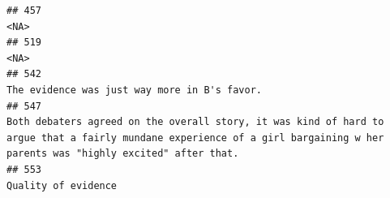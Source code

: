 \documentclass[
]{article}
\begin{document}
\begin{verbatim}
## 457                                                                                                                                                                                                                                                                                                                                                                                                                                                                                                                                                                                               <NA>
## 519                                                                                                                                                                                                                                                                                                                                                                                                                                                                                                                                                                                               <NA>
## 542                                                                                                                                                                                                                                                                                                                                                                                                                                                                                                                                                       The evidence was just way more in B's favor.
## 547                                                                                                                                                                                                                                                                                                                                                                                                                       Both debaters agreed on the overall story, it was kind of hard to argue that a fairly mundane experience of a girl bargaining w her parents was "highly excited" after that.
## 553                                                                                                                                                                                                                                                                                                                                                                                                                                                                                                                                                                                Quality of evidence

\end{verbatim}
\end{document}

